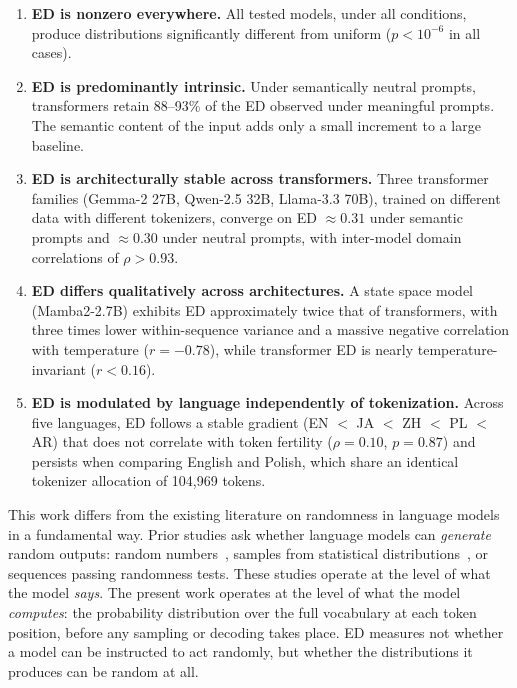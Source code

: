 \documentclass{article}
\begin{document}
\begin{enumerate}
\item \textbf{ED is nonzero everywhere.} All tested models, under all conditions, produce distributions significantly different from uniform ($p < 10^{-6}$ in all cases).

\item \textbf{ED is predominantly intrinsic.} Under semantically neutral prompts, transformers retain 88--93\% of the ED observed under meaningful prompts. The semantic content of the input adds only a small increment to a large baseline.

\item \textbf{ED is architecturally stable across transformers.} Three transformer families (Gemma-2 27B, Qwen-2.5 32B, Llama-3.3 70B), trained on different data with different tokenizers, converge on ED $\approx 0.31$ under semantic prompts and $\approx 0.30$ under neutral prompts, with inter-model domain correlations of $\rho > 0.93$.

\item \textbf{ED differs qualitatively across architectures.} A state space model (Mamba2-2.7B) exhibits ED approximately twice that of transformers, with three times lower within-sequence variance and a massive negative correlation with temperature ($r = -0.78$), while transformer ED is nearly temperature-invariant ($r < 0.16$).

\item \textbf{ED is modulated by language independently of tokenization.} Across five languages, ED follows a stable gradient (EN $<$ JA $<$ ZH $<$ PL $<$ AR) that does not correlate with token fertility ($\rho = 0.10$, $p = 0.87$) and persists when comparing English and Polish, which share an identical tokenizer allocation of 104,969 tokens.
\end{enumerate}

This work differs from the existing literature on randomness in language models in a fundamental way. Prior studies ask whether language models can \emph{generate} random outputs: random numbers~\citep{hopkins2023llm_sampling, coronado2025deterministic}, samples from statistical distributions~\citep{zhao2026bad_dice}, or sequences passing randomness tests. These studies operate at the level of what the model \emph{says}. The present work operates at the level of what the model \emph{computes}: the probability distribution over the full vocabulary at each token position, before any sampling or decoding takes place. ED measures not whether a model can be instructed to act randomly, but whether the distributions it produces can be random at all.
\end{document}
